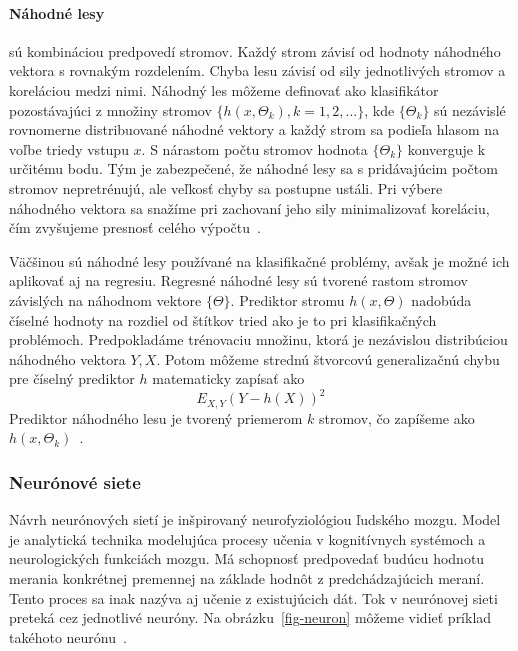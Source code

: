 \documentclass[a4paper,slovak,12pt,appendix]{article}
\begin{document}

\paragraph{Náhodné lesy} sú kombináciou predpovedí stromov. Každý strom závisí
od hodnoty náhodného vektora s rovnakým rozdelením. Chyba lesu závisí od sily
jednotlivých stromov a koreláciou medzi nimi. Náhodný les môžeme definovať ako
klasifikátor pozostávajúci z množiny stromov $\{h(x, \Theta_k), k=1, 2, ... \}$,
kde $\{\Theta_k\}$ sú nezávislé rovnomerne distribuované náhodné vektory a každý
strom sa podieľa hlasom na voľbe triedy vstupu $x$. S nárastom počtu stromov
hodnota $\{\Theta_k\}$ konverguje k určitému bodu. Tým je zabezpečené, že
náhodné lesy sa s pridávajúcim počtom stromov nepretrénujú, ale veľkosť chyby
sa postupne ustáli. Pri výbere náhodného vektora sa snažíme pri zachovaní jeho
sily minimalizovať koreláciu, čím zvyšujeme presnosť celého
výpočtu~\cite{Breiman2001}.

Väčšinou sú náhodné lesy používané na klasifikačné problémy, avšak je možné ich
aplikovať aj na regresiu. Regresné náhodné lesy sú tvorené rastom stromov
závislých na náhodnom vektore $\{\Theta\}$. Prediktor stromu $h(x, \Theta)$
nadobúda číselné hodnoty na rozdiel od štítkov tried ako je to pri klasifikačných
problémoch. Predpokladáme trénovaciu množinu, ktorá je nezávislou distribúciou
náhodného vektora $Y, X$. Potom môžeme strednú štvorcovú generalizačnú chybu
pre číselný prediktor $h$ matematicky zapísať ako
\begin{equation}
  E_{X, Y} (Y - h(X))^2
  \label{eq-random-error}
\end{equation}
Prediktor náhodného lesu je tvorený priemerom $k$ stromov, čo zapíšeme ako
$h(x, \Theta_k)$~\cite{Breiman2001}.


\subsubsection{Neurónové siete}
Návrh neurónových sietí je inšpirovaný neurofyziológiou ľudského mozgu. Model
je analytická technika modelujúca procesy učenia v kognitívnych systémoch
a neurologických funkciách mozgu. Má schopnosť predpovedať budúcu hodnotu
merania konkrétnej premennej na základe hodnôt z predchádzajúcich meraní. Tento
proces sa inak nazýva aj učenie z existujúcich dát. Tok v neurónovej sieti
preteká cez jednotlivé neuróny. Na obrázku~\ref{fig-neuron} môžeme vidieť
príklad takéhoto neurónu~\cite{Tso2007}.
\end{document}
